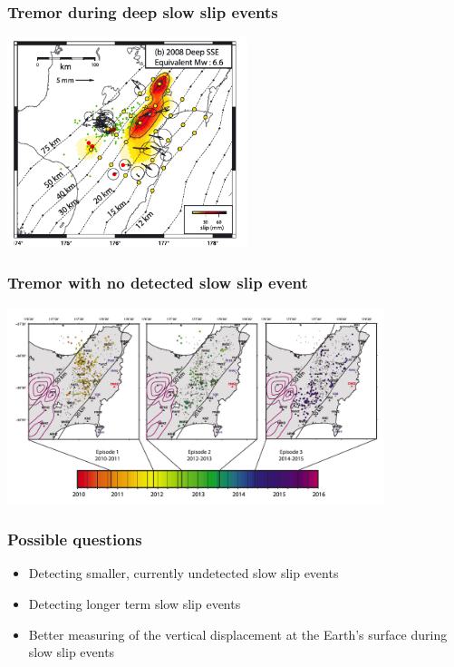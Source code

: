 \documentclass{beamer}
\begin{document}
	\begin{frame}
		\frametitle{Tremor during deep slow slip events}
		\begin{center}
			\includegraphics[trim={0cm 0cm 0cm 0cm}, clip, width=7cm]{articles/wallace_eberhart-phillips_2013_3b.png}
		\end{center}
	\end{frame}

	\begin{frame}
		\frametitle{Tremor with no detected slow slip event}
		\begin{center}
			\includegraphics[trim={0cm 0cm 0cm 0cm}, clip, width=11cm]{articles/todd_schwartz_2016_6.png}
		\end{center}
	\end{frame}

	\begin{frame}
		\frametitle{Possible questions}
		\begin{itemize}
			\item Detecting smaller, currently undetected slow slip events
			\item Detecting longer term slow slip events
			\item Better measuring of the vertical displacement at the Earth’s surface during slow slip events
		\end{itemize}
	\end{frame}
\end{document}
